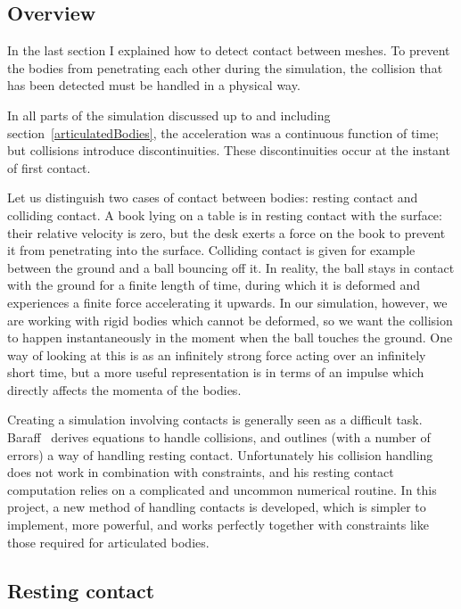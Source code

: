 \subsection{Overview}

In the last section I explained how to detect contact between meshes. To prevent the bodies from
penetrating each other during the simulation, the collision that has been detected must be
handled in a physical way.

In all parts of the simulation discussed up to and including section~\ref{articulatedBodies}, the
acceleration was a continuous function of time; but collisions introduce discontinuities. These
discontinuities occur at the instant of first contact.

Let us distinguish two cases of contact between bodies: resting contact and colliding contact.
A book lying on a table is in resting contact with the surface: their relative velocity is zero,
but the desk exerts a force on the book to prevent it from penetrating into the surface.
Colliding contact is given for example between the ground and a ball bouncing off it. In reality,
the ball stays in contact with the ground for a finite length of time, during which it is
deformed and experiences a finite force accelerating it upwards. In our simulation, however, we
are working with rigid bodies which cannot be deformed, so we want the collision to happen
instantaneously in the moment when the ball touches the ground. One way of looking at this is as
an infinitely strong force acting over an infinitely short time, but a more useful representation
is in terms of an impulse which directly affects the momenta of the bodies.

Creating a simulation involving contacts is generally seen as a difficult task.
Baraff~\cite{BaraffWitkin:97} derives equations to handle collisions, and outlines (with a number
of errors) a way of handling resting contact. Unfortunately his collision handling does not work
in combination with constraints, and his resting contact computation relies on a complicated and
uncommon numerical routine. In this project, a new method of handling contacts is developed, which
is simpler to implement, more powerful, and works perfectly together with constraints like those
required for articulated bodies.


\subsection{Resting contact\label{restingContact}}

